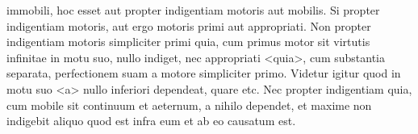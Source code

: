 \documentclass[12pt]{article}
\begin{document}
\beginnumbering

\pstart 
immobili, hoc esset aut propter indigentiam motoris aut mobilis. Si
propter indigentiam motoris, aut ergo  motoris primi aut
appropriati. Non propter indigentiam motoris simpliciter primi quia,
cum primus motor sit virtutis infinitae in motu suo, nullo indiget,
nec appropriati <quia>, cum 
substantia separata, perfectionem suam
 a motore simpliciter
primo. Videtur igitur quod in motu suo <a> nullo inferiori dependeat,
quare etc. Nec propter indigentiam  quia, cum mobile sit continuum et aeternum, a nihilo dependet,
et maxime non indigebit aliquo quod est infra eum et ab eo causatum
est.  
\pend

\endnumbering
\end{document}
